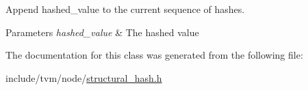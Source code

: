 Append hashed\+\_\+value to the current sequence of hashes. 


\begin{DoxyParams}{Parameters}
{\em hashed\+\_\+value} & The hashed value \\
\hline
\end{DoxyParams}


The documentation for this class was generated from the following file\+:\begin{DoxyCompactItemize}
\item 
include/tvm/node/\hyperlink{structural__hash_8h}{structural\+\_\+hash.\+h}\end{DoxyCompactItemize}
